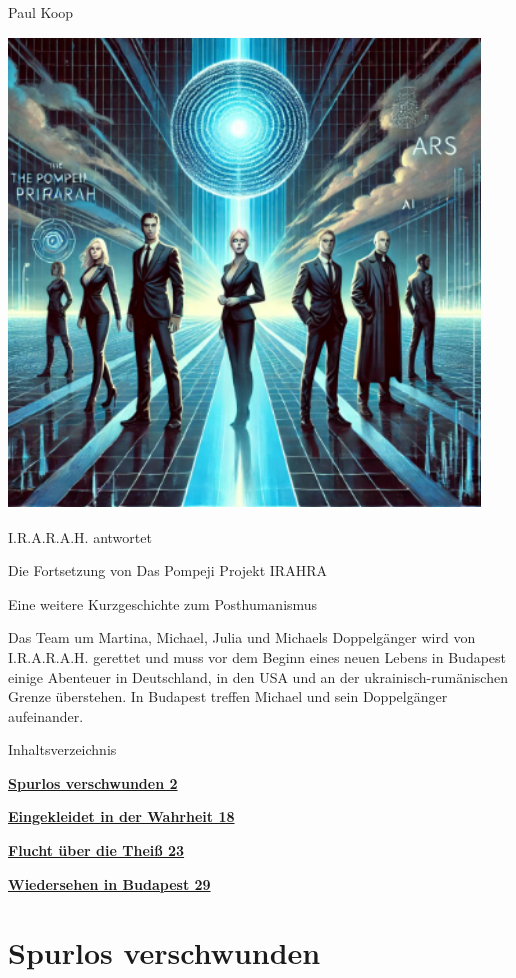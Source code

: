 \documentclass[
]{article}
\author{}
\date{}
\begin{document}
Paul Koop

\includegraphics[width=4.92849in,height=4.92031in]{media/image001.png}

I.R.A.R.A.H. antwortet

Die Fortsetzung von Das Pompeji Projekt IRAHRA

Eine weitere Kurzgeschichte zum Posthumanismus

Das Team um Martina, Michael, Julia und Michaels Doppelgänger wird von
I.R.A.R.A.H. gerettet und muss vor dem Beginn eines neuen Lebens in
Budapest einige Abenteuer in Deutschland, in den USA und an der
ukrainisch-rumänischen Grenze überstehen. In Budapest treffen Michael
und sein Doppelgänger aufeinander.

Inhaltsverzeichnis

\hyperref[spurlos-verschwunden]{\textbf{Spurlos verschwunden 2}}

\hyperref[eingekleidet-in-der-wahrheit]{\textbf{Eingekleidet in der
Wahrheit 18}}

\hyperref[flucht-uxfcber-die-theiuxdf]{\textbf{Flucht über die Theiß
23}}

\hyperref[wiedersehen-in-budapest]{\textbf{Wiedersehen in Budapest 29}}

\section{Spurlos verschwunden}\label{spurlos-verschwunden}
\end{document}
